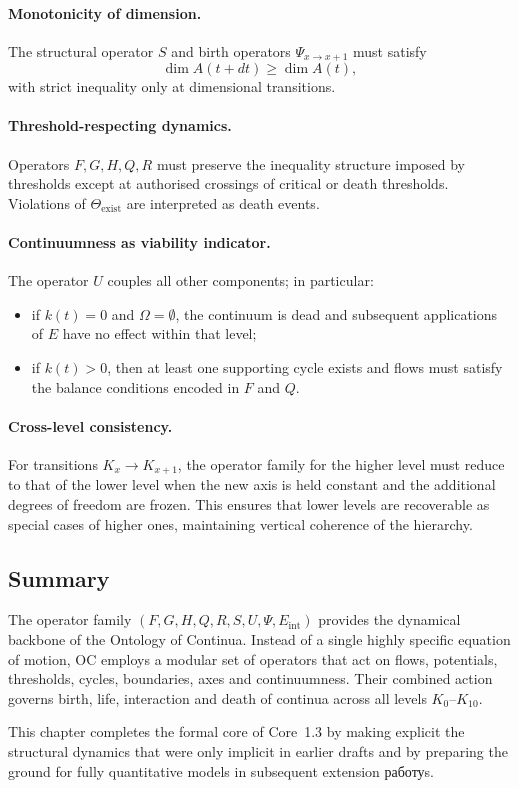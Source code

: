 \paragraph{Monotonicity of dimension.}
The structural operator \(S\) and birth operators \(\Psi_{x\to x+1}\) must
satisfy
\[
  \dim A(t+dt) \ge \dim A(t),
\]
with strict inequality only at dimensional transitions.

\paragraph{Threshold-respecting dynamics.}
Operators \(F, G, H, Q, R\) must preserve the inequality structure imposed by
thresholds except at authorised crossings of critical or death thresholds.
Violations of \(\Theta_{\mathrm{exist}}\) are interpreted as death events.

\paragraph{Continuumness as viability indicator.}
The operator \(U\) couples all other components; in particular:
\begin{itemize}
  \item if \(k(t) = 0\) and \(\Omega = \emptyset\), the continuum is dead and
        subsequent applications of \(E\) have no effect within that level;
  \item if \(k(t) > 0\), then at least one supporting cycle exists and flows
        must satisfy the balance conditions encoded in \(F\) and \(Q\).
\end{itemize}

\paragraph{Cross-level consistency.}
For transitions \(K_x \to K_{x+1}\), the operator family for the higher level
must reduce to that of the lower level when the new axis is held constant and
the additional degrees of freedom are frozen. This ensures that lower levels
are recoverable as special cases of higher ones, maintaining vertical
coherence of the hierarchy.

\subsection{Summary}

The operator family \((F, G, H, Q, R, S, U, \Psi, E_{\mathrm{int}})\) provides
the dynamical backbone of the Ontology of Continua. Instead of a single
highly specific equation of motion, OC employs a modular set of operators that
act on flows, potentials, thresholds, cycles, boundaries, axes and
continuumness. Their combined action governs birth, life, interaction and
death of continua across all levels \(K_0\)–\(K_{10}\).

This chapter completes the formal core of Core~1.3 by making explicit the
structural dynamics that were only implicit in earlier drafts and by preparing
the ground for fully quantitative models in subsequent extension работуs.

